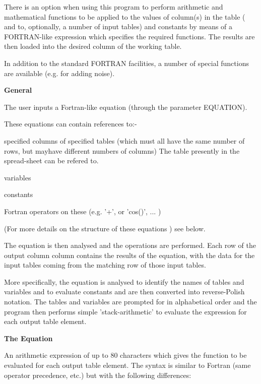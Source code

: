 \begin{small}
{{ There is an option when using this program to perform arithmetic
 and mathematical functions to be applied to the values of column(s) in
 the table ( and to, optionally, a number of input tables) and
 constants by means of a FORTRAN-like expression which specifies the
 required functions. The results are then loaded into the desired
 column of the working table.

 In addition to the standard FORTRAN facilities, a number of special
 functions are available (e.g. for adding noise).

  {\bf \large General}

 The user inputs a Fortran-like equation (through the parameter
 EQUATION).

 These equations can contain references to:-

  \begin{list}{{-}}{}
   \item specified columns of specified tables (which must all have the
        same number of rows, but mayhave different numbers of columns)
        The table presently in the spread-sheet can be refered to.
   \item variables
   \item constants
   \item Fortran operators on these (e.g. '+', or 'cos()', ... )
   \end{list}

 (For more details on the structure of these equations ) see below.

 The equation is then analysed and the operations are performed.
 Each row of the output column column contains the results of the
 equation, with the data for the input tables coming from the matching
 row of those input tables.

 More specifically, the equation is analysed to identify the names
 of tables and variables and to evaluate constants and are then
 converted into reverse-Polish notation. The tables and variables are
 prompted for in alphabetical order and the program then performs
 simple 'stack-arithmetic' to evaluate the expression for each output
 table element.

 {\bf \large The Equation}

 An arithmetic expression of up to 80 characters which gives the
 function to be evaluated for each output table element. The syntax
 is similar to Fortran (same operator precedence, etc.) but with the
 following differences:

 \begin{enumerate}


\end{enumerate}}}
\end{small}
